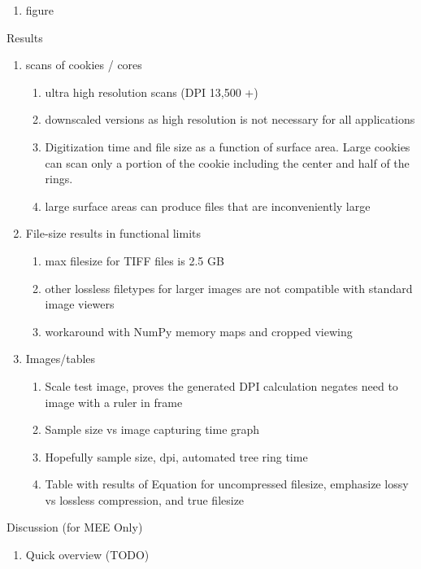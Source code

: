\documentclass{article}
\begin{document}
\begin{outline}[enumerate]
\begin{enumerate}
\begin{enumerate}
\begin{enumerate}
						\item figure
					\end{enumerate}
			\end{enumerate}
		\end{enumerate}
\item Results
	\begin{enumerate}
	\item scans of cookies / cores
		\begin{enumerate}
		\item ultra high resolution scans (DPI 13,500 +)
		\item downscaled versions as high resolution is not necessary for all applications
		\item Digitization time and file size as a function of surface area. Large cookies can scan only a portion of the cookie including the center and half of the rings.
		\item large surface areas can produce files that are inconveniently large
		\end{enumerate}
	\item File-size results in functional limits 
		\begin{enumerate}
		\item max filesize for TIFF files is 2.5 GB
		\item other lossless filetypes for larger images are not compatible with standard image viewers
		\item workaround with NumPy memory maps and cropped viewing 
		\end{enumerate}
	\item Images/tables	
		\begin{enumerate}
		\item Scale test image, proves the generated DPI calculation negates need to image with a ruler in frame
		\item Sample size vs image capturing time graph
		\item Hopefully sample size, dpi, automated tree ring time
		\item Table with results of Equation for uncompressed filesize, emphasize lossy vs lossless compression, and true filesize %
		\end{enumerate}
	\end{enumerate}
\item Discussion (for MEE Only) 
	\begin{enumerate}
	\item Quick overview (TODO)

\end{enumerate}
\end{outline}
\end{document}
